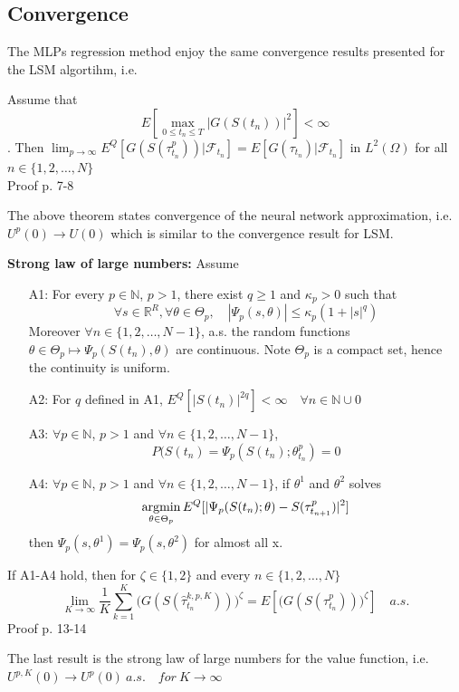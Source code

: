 \subsection{Convergence}
The MLPs regression method enjoy the same convergence results presented for the LSM algortihm, i.e.
\begin{theorem}\label{NNConvergence1}
Assume that 
$$E[\max_{0\leq t_n \leq T} |G(S(t_n))|^2]< \infty$$. 
Then $\lim_{p \to \infty} E^Q[G(S(\tau^{p}_{t_n}))| \mathcal{F}_{t_n}]= E[G(\tau_{t_n})|\mathcal{F}_{t_n}]$ in $L^2(\Omega)$ for all $n \in \{1,2,\ldots, N\}$\\
Proof p. 7-8 \parencite{Lelong19}
\end{theorem}
The above theorem states convergence of the neural network approximation, i.e. $U^{p}(0) \to U(0)$ which is similar to the convergence result for LSM. 
\begin{theorem}{\textbf{Strong law of large numbers: }}\label{NNConvergence2}
Assume
\begin{enumerate}
\item[A1:] For every $p\in \mathbb{N}$, $p>1$, there exist $q \geq 1$ and $\kappa_p>0$ such that
$$\forall s \in \mathbb{R}^{R}, \forall \theta \in \Theta_p, \quad |\Psi_p(s,\theta)| \leq \kappa_p (1+|s|^q) $$
Moreover $\forall n \in \{1,2,\ldots, N-1\}$, a.s. the random functions $\theta \in \Theta_p \mapsto \Psi_p(S(t_n), \theta)$ are continuous. Note $\Theta_p$ is a compact set, hence the continuity is uniform.
\item[A2:] For $q$ defined in A1, $E^Q[|S(t_n)|^{2q}]<\infty \quad \forall n \in \mathbb{N} \cup 0$
\item[A3:] $\forall p \in \mathbb{N}$, $p>1$ and $\forall n \in \{1,2,\ldots, N-1\}$, 
$$P(S(t_n)=\Psi_{p}(S(t_n);\theta_{t_n}^{p})=0$$
\item[A4:] $\forall p \in \mathbb{N}$, $p>1$ and $\forall n \in \{1,2,\ldots, N-1\}$, if $\theta^{1}$ and $\theta^{2}$ solves 
\begin{align*}
\operatorname*{argmin}_{\theta \in \Theta_p} E^Q[|\Psi_p(S(t_n); \theta)- S(\tau_{t_{n+1}}^{p})|^2]
\end{align*}
then $\Psi_p(s,\theta^{1})=\Psi_p(s,\theta^{2})$ for almost all x.
\end{enumerate}
If A1-A4 hold, then for $\zeta\in \{1,2\}$ and every $n\in \{1,2,\ldots,N\}$
\begin{equation}
\lim_{K\to \infty} \dfrac{1}{K} \sum_{k=1}^{K} \bigg(G(S(\hat{\tau}_{t_n}^{k,p,K}))\bigg)^{\zeta} = E[\bigg(G(S(\tau_{t_n}^{p}))\bigg)^{\zeta}] \quad a.s.
\end{equation}
Proof p. 13-14 \parencite{Lelong19}
\end{theorem}
The last result is the strong law of large numbers for the value function, i.e. $U^{p,K}(0) \to U^{p}(0) \ a.s. \quad for \ K \to \infty$
\newpage



